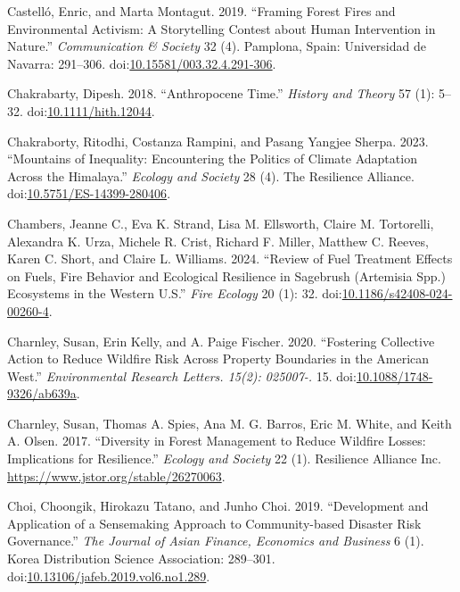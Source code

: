 \documentclass[
]{article}
\newlength{\cslhangindent}
\newenvironment{CSLReferences}[2] %
 {\begin{list}{}{%
  \setlength{\itemindent}{0pt}
  \setlength{\leftmargin}{0pt}
  \setlength{\parsep}{0pt}
  \ifodd #1
   \setlength{\leftmargin}{\cslhangindent}
   \setlength{\itemindent}{-1\cslhangindent}
  \fi
  \setlength{\itemsep}{#2\baselineskip}}}
 {\end{list}}
\begin{document}
\begin{CSLReferences}{1}{0}
Castelló, Enric, and Marta Montagut. 2019. {``Framing {Forest Fires} and {Environmental Activism}: A {Storytelling Contest} about {Human Intervention} in {Nature}.''} \emph{Communication \& Society} 32 (4). Pamplona, Spain: Universidad de Navarra: 291--306. doi:\href{https://doi.org/10.15581/003.32.4.291-306}{10.15581/003.32.4.291-306}.

Chakrabarty, Dipesh. 2018. {``Anthropocene {Time}.''} \emph{History and Theory} 57 (1): 5--32. doi:\href{https://doi.org/10.1111/hith.12044}{10.1111/hith.12044}.

Chakraborty, Ritodhi, Costanza Rampini, and Pasang Yangjee Sherpa. 2023. {``Mountains of Inequality: Encountering the Politics of Climate Adaptation Across the {Himalaya}.''} \emph{Ecology and Society} 28 (4). The Resilience Alliance. doi:\href{https://doi.org/10.5751/ES-14399-280406}{10.5751/ES-14399-280406}.

Chambers, Jeanne C., Eva K. Strand, Lisa M. Ellsworth, Claire M. Tortorelli, Alexandra K. Urza, Michele R. Crist, Richard F. Miller, Matthew C. Reeves, Karen C. Short, and Claire L. Williams. 2024. {``Review of Fuel Treatment Effects on Fuels, Fire Behavior and Ecological Resilience in Sagebrush ({Artemisia} Spp.) Ecosystems in the {Western U}.{S}.''} \emph{Fire Ecology} 20 (1): 32. doi:\href{https://doi.org/10.1186/s42408-024-00260-4}{10.1186/s42408-024-00260-4}.

Charnley, Susan, Erin Kelly, and A. Paige Fischer. 2020. {``Fostering Collective Action to Reduce Wildfire Risk Across Property Boundaries in the {American West}.''} \emph{Environmental Research Letters. 15(2): 025007-.} 15. doi:\href{https://doi.org/10.1088/1748-9326/ab639a}{10.1088/1748-9326/ab639a}.

Charnley, Susan, Thomas A. Spies, Ana M. G. Barros, Eric M. White, and Keith A. Olsen. 2017. {``Diversity in Forest Management to Reduce Wildfire Losses: Implications for Resilience.''} \emph{Ecology and Society} 22 (1). Resilience Alliance Inc. \url{https://www.jstor.org/stable/26270063}.

Choi, Choongik, Hirokazu Tatano, and Junho Choi. 2019. {``Development and {Application} of a {Sensemaking Approach} to {Community-based Disaster Risk Governance}.''} \emph{The Journal of Asian Finance, Economics and Business} 6 (1). Korea Distribution Science Association: 289--301. doi:\href{https://doi.org/10.13106/jafeb.2019.vol6.no1.289}{10.13106/jafeb.2019.vol6.no1.289}.


\end{CSLReferences}
\end{document}
